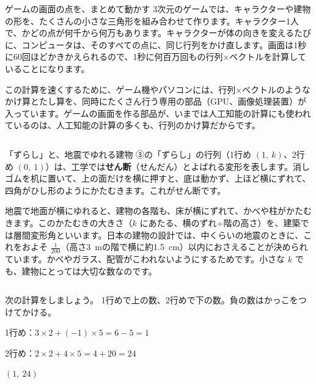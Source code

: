 \begin{column}{ゲームの画面の点を、まとめて動かす}
3次元のゲームでは、キャラクターや建物の形を、たくさんの小さな三角形を組み合わせて作ります。キャラクター1人で、かどの点が何千から何万もあります。キャラクターが体の向きを変えるたびに、コンピュータは、そのすべての点に、同じ行列をかけ直します。画面は1秒に60回ほどかきかえられるので、1秒に何百万回もの行列×ベクトルを計算していることになります。

この計算を速くするために、ゲーム機やパソコンには、行列×ベクトルのようなかけ算とたし算を、同時にたくさん行う専用の部品（GPU、画像処理装置）が入っています。ゲームの画面を作る部品が、いまでは人工知能の計算にも使われているのは、人工知能の計算の多くも、行列のかけ算だからです。
\end{column}

\begin{column}{「ずらし」と、地震でゆれる建物}
③の「ずらし」の行列（1行め $(1,\ k)$、2行め $(0,\ 1)$）は、工学では\textbf{せん断}（せんだん）とよばれる変形を表します。消しゴムを机に置いて、上の面だけを横に押すと、底は動かず、上ほど横にずれて、四角がひし形のようにかたむきます。これがせん断です。

地震で地面が横にゆれると、建物の各階も、床が横にずれて、かべや柱がかたむきます。このかたむきの大きさ（$k$ にあたる、横のずれ÷階の高さ）を、建築では層間変形角といいます。日本の建物の設計では、中くらいの地震のときに、これをおよそ $\frac{1}{200}$（高さ\qty{3}{m}の階で横に約\qty{1.5}{cm}）以内におさえることが決められています。かべやガラス、配管がこわれないようにするためです。小さな $k$ でも、建物にとっては大切な数なのです。
\end{column}


\begin{reidai}[行列×ベクトルを成分で]
次の計算をしましょう。
\kangaekata 1行めで上の数、2行めで下の数。負の数はかっこをつけてかける。\par
\shiki\kviics{}\zw{} 1行め：$3\times2+(-1)\times5=6-5=1$\par
\kviica 2行め：$2\times2+4\times5=4+20=24$\par
\kotae\kviics{}\zw{} $(1,\ 24)$
\end{reidai}

